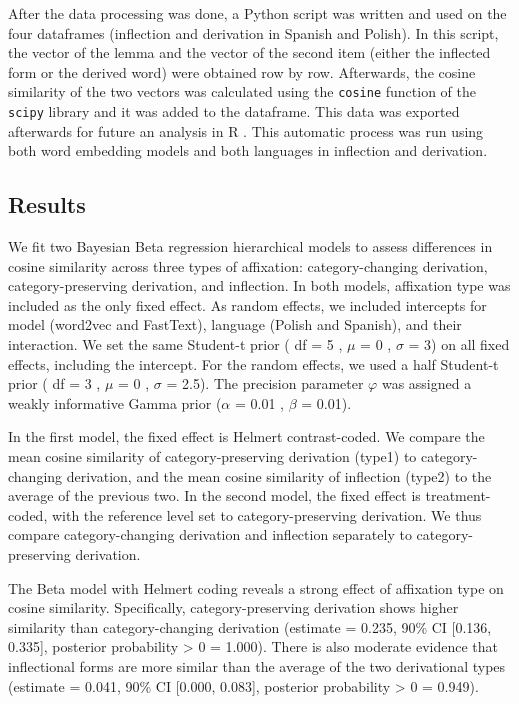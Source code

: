 \documentclass[12pt]{article}
\begin{document}
After the data processing was done, a Python script was written and used on the four dataframes (inflection and derivation in Spanish and Polish). In this script, the vector of the lemma and the vector of the second item (either the inflected form or the derived word) were obtained row by row. Afterwards, the cosine similarity of the two vectors was calculated using the \texttt{cosine} function of the \texttt{scipy} library and it was added to the dataframe. This data was exported afterwards for future an analysis in R \parencite{rlanguage}. This automatic process was run using both word embedding models and both languages in inflection and derivation.

\subsection{Results} \label{results1}

We fit two Bayesian Beta regression hierarchical models to assess differences in cosine similarity across three types of affixation: category-changing derivation, category-preserving derivation, and inflection. In both models, affixation type was included as the only fixed effect. As random effects, we included intercepts for model (word2vec and FastText), language (Polish and Spanish), and their interaction. We set the same Student-t prior ( df = 5 , $\mu$ = 0 , $\sigma$ = 3) on all fixed effects, including the intercept. For the random effects, we used a half Student-t prior ( df = 3 , $\mu$ = 0 , $\sigma$ = 2.5). The precision parameter $\varphi$ was assigned a weakly informative Gamma prior ($\alpha$ = 0.01 , $\beta$ = 0.01).

In the first model, the fixed effect is Helmert contrast-coded. We compare the mean cosine similarity of category-preserving derivation (type1) to category-changing derivation, and the mean cosine similarity of inflection (type2) to the average of the previous two. In the second model, the fixed effect is treatment-coded, with the reference level set to category-preserving derivation. We thus compare category-changing derivation and inflection separately to category-preserving derivation.

The Beta model with Helmert coding reveals a strong effect of affixation type on cosine similarity. Specifically, category-preserving derivation shows higher similarity than category-changing derivation (estimate = 0.235, 90\% CI [0.136, 0.335], posterior probability > 0 = 1.000). There is also moderate evidence that inflectional forms are more similar than the average of the two derivational types (estimate = 0.041, 90\% CI [0.000, 0.083], posterior probability > 0 = 0.949).
\end{document}
